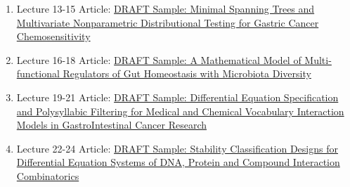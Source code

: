 \documentclass{TMLSStyleGuideResumeVitae}
\begin{document}
\begin{enumerate}
{A Mathematical Model of Molecular Complexity and 
Epigenetic Modifications with Mucin Regulation in GastroIntestinal Cancers}
\item Lecture 13-15 Article: \href{}{DRAFT Sample: 
Minimal Spanning Trees and Multivariate Nonparametric Distributional Testing
for Gastric Cancer Chemosensitivity}
\item Lecture 16-18 Article: \href{}{DRAFT Sample: 
A Mathematical Model of Multi-functional Regulators of 
Gut Homeostasis with Microbiota Diversity}
\item Lecture 19-21 Article: \href{}{DRAFT Sample:
Differential Equation Specification 
and Polysyllabic Filtering for 
Medical and Chemical Vocabulary Interaction Models 
in GastroIntestinal Cancer Research}
\item Lecture 22-24 Article: \href{}{DRAFT Sample: 
Stability Classification Designs for 
Differential Equation Systems of DNA, 
Protein and Compound Interaction Combinatorics}

\end{enumerate}
\end{document}
